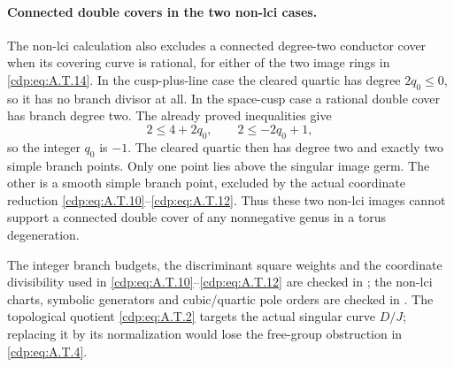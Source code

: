 \paragraph{Connected double covers in the two non-lci cases.}
The non-lci calculation also excludes a connected
degree-two conductor cover when its covering curve
is rational, for either of the two image rings in
\eqref{cdp:eq:A.T.14}. In the cusp-plus-line case the cleared
quartic has degree $2q_0\le0$, so it has no branch
divisor at all. In the space-cusp case a rational
double cover has branch degree two. The already
proved inequalities give
\[
                2\le4+2q_0,\qquad 2\le-2q_0+1,
\]
so the integer $q_0$ is $-1$. The cleared quartic
then has degree two and exactly two simple branch
points. Only one point lies above the singular
image germ. The other is a smooth simple branch
point, excluded by the actual coordinate reduction
\eqref{cdp:eq:A.T.10}--\eqref{cdp:eq:A.T.12}. Thus these two non-lci images
cannot support a connected double cover of any
nonnegative genus in a torus degeneration.

The integer branch budgets, the discriminant square
weights and the coordinate divisibility used in
\eqref{cdp:eq:A.T.10}--\eqref{cdp:eq:A.T.12} are checked in
; the non-lci charts,
symbolic generators and cubic/quartic pole orders
are checked in .
The topological
quotient \eqref{cdp:eq:A.T.2} targets the actual singular curve
$D/J$; replacing it by its normalization would
lose the free-group obstruction in \eqref{cdp:eq:A.T.4}.


